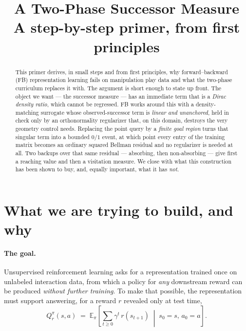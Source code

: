 \documentclass[11pt]{article}
\title{\bfseries A Two-Phase Successor Measure\\[2pt]
\large A step-by-step primer, from first principles}
\author{}
\date{}
\newcommand{\E}{\mathbb{E}}
\begin{document}
\maketitle
\vspace{-2.2em}

\begin{abstract}
\noindent
This primer derives, in small steps and from first principles, why
forward--backward (FB) representation learning fails on manipulation play data and
what the two-phase curriculum replaces it with. The argument is short enough to
state up front. The object we want --- the successor measure --- has an immediate
term that is a \emph{Dirac density ratio}, which cannot be regressed. FB works
around this with a density-matching surrogate whose observed-successor term is
\emph{linear and unanchored}, held in check only by an orthonormality regularizer
that, on this domain, destroys the very geometry control needs. Replacing the
point query by a \emph{finite goal region} turns that singular term into a bounded
$0/1$ event, at which point every entry of the training matrix becomes an ordinary
squared Bellman residual and no regularizer is needed at all. Two backups over
that same residual --- absorbing, then non-absorbing --- give first a reaching
value and then a visitation measure. We close with what this construction has been
shown to buy, and, equally important, what it has \emph{not}.
\end{abstract}

\tableofcontents
\bigskip

\section{What we are trying to build, and why}

\paragraph{The goal.} Unsupervised reinforcement learning asks for a
representation trained once on unlabeled interaction data, from which a policy for
\emph{any} downstream reward can be produced \emph{without further training}. To
make that possible, the representation must support answering, for a reward
$r$ revealed only at test time,
\[
Q_r^\pi(s,a) \;=\; \E_\pi\!\left[\sum_{t\ge0}\gamma^t\, r(s_{t+1}) \;\middle|\; s_0=s,\,a_0=a\right].
\]
\end{document}
